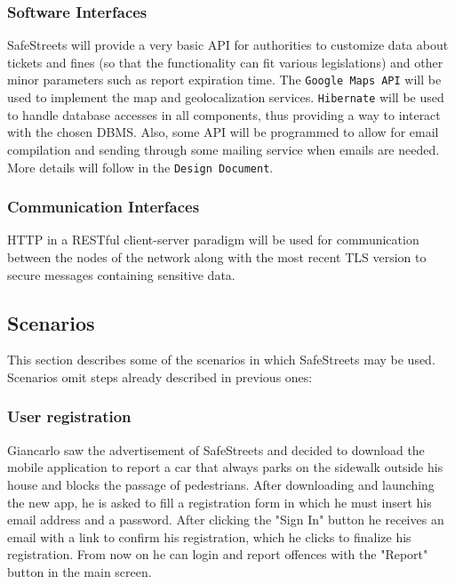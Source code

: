 \documentclass[12pt,a4paper]{article}
\begin{document}
\subsubsection{Software Interfaces}
SafeStreets will provide a very basic API for authorities to customize data about tickets and fines (so that the functionality can fit various legislations) and other minor parameters such as report expiration time.
The \texttt{Google Maps API} will be used to implement the map and geolocalization services. 
\texttt{Hibernate} will be used to handle database accesses in all components, thus providing a way to interact with the chosen DBMS.
Also, some API will be programmed to allow for email compilation and sending through some mailing service when emails are needed.
More details will follow in the \texttt{Design Document}.
\subsubsection{Communication	Interfaces}
HTTP in a RESTful client-server paradigm will be used for communication between the nodes of the network along with the most recent TLS version to secure messages containing sensitive data. 
\subsection{Scenarios}
This section describes some of the scenarios in which SafeStreets may be used. Scenarios omit steps already described in previous ones: 

\subsubsection{User registration}
Giancarlo saw the advertisement of SafeStreets and decided to download the mobile application to report a car that always parks on the sidewalk outside his house and blocks the passage of pedestrians. After downloading and launching the new app, he is asked to fill a registration form in which he must insert his email address and a password. After clicking the "Sign In" button he receives an email with a link to confirm his registration, which he clicks to finalize his registration. From now on he can login and report offences with the "Report" button in the main screen.
\end{document}
